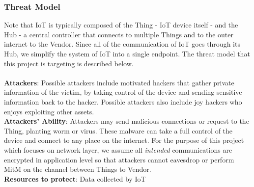 \subsubsection{Threat Model}
Note that IoT is typically composed of the Thing - IoT device itself - and the Hub - a central controller that connects to multiple Things and to the outer internet to the Vendor.
Since all of the communication of IoT goes through its Hub, we simplify the system of IoT into a single endpoint. The threat model that this project is targeting is described below. \\
\\
\textbf{Attackers}: Possible attackers include motivated hackers that gather private information of the victim, by taking control of the device and sending sensitive information back to the hacker. Possible attackers also include joy hackers who enjoys exploiting other assets.  \\
\textbf{Attackers' Ability}: Attackers may send malicious connections or request to the Thing, planting worm or virus. These malware can take a full control of the device and connect to any place on the internet. For the purpose of this project which focuses on network layer, we assume all \textit{intended} communications are encrypted in application level so that attackers cannot eavesdrop or perform MitM on the channel between Things to Vendor. \\
\textbf{Resources to protect}: Data collected by IoT \\ 

